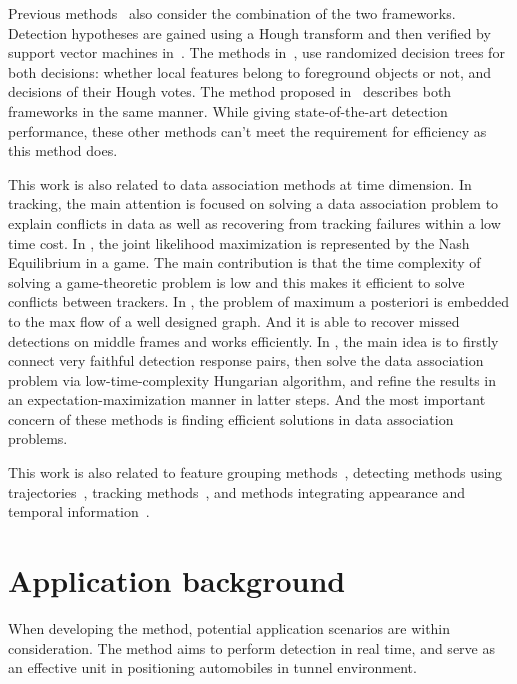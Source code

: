 Previous methods~\citep{ac34} also consider the combination of the two frameworks. Detection hypotheses are gained using a Hough transform and then verified by support vector machines in~\citep{ac10,ac25}. The methods in~\citep{ac6,ac7}, use randomized decision trees for both decisions: whether local features belong to foreground objects or not, and decisions of their Hough votes. The method proposed in~\citep{ac27} describes both frameworks in the same manner. While giving state-of-the-art detection performance, these other methods can't meet the requirement for efficiency as this method does.







This work is also related to data association methods at time dimension. In tracking, the main attention is focused on solving a data
association problem to explain conflicts in data as well as
recovering from tracking failures within a low time cost. In
\citep{ij9}, the joint likelihood maximization is represented by the
Nash Equilibrium in a game. The main contribution is that the time
complexity of solving a game-theoretic problem is low and this makes it efficient to
solve conflicts between trackers. In
\citep{ij10}, the problem of maximum a posteriori is embedded to the max flow of a well designed
graph. And it is able to recover
missed detections on middle frames and works efficiently. In
\citep{my7}, the main idea is to firstly connect very faithful
detection response pairs, then solve the data association problem
via low-time-complexity Hungarian algorithm, and refine the results
in an expectation-maximization manner in latter steps. And the most important concern of these methods
is finding efficient solutions in   data association problems.

This work is also related to feature grouping methods~\citep{ac25}, detecting methods using trajectories~\citep{my9,ac24}, tracking methods~\citep{my7,my10}, and methods integrating appearance and temporal information~\citep{ac23}.




\section{Application background}
\label{ab}

When developing the method, potential application scenarios are within consideration. The method aims to perform detection in real time, and serve as an effective unit in positioning automobiles in tunnel environment.


